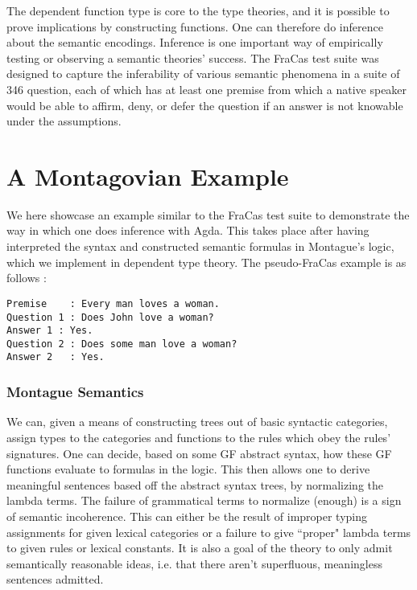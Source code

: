 \documentclass[a4paper, 11pt]{article}
\begin{document}
The dependent function type is core to the type theories, and it is possible to
prove implications by constructing functions. One can therefore do inference
about the semantic encodings. Inference is one important way of empirically
testing or observing a semantic theories' success. The FraCas test suite
\cite{cooper1996using} was designed to capture the inferability of various
semantic phenomena in a suite of 346 question, each of which has at least one
premise from which a native speaker would be able to affirm, deny, or defer the
question if an answer is not knowable under the assumptions.

\section{A Montagovian Example}

We here showcase an example similar to the FraCas test suite to demonstrate the
way in which one does inference with Agda. This takes place after having
interpreted the syntax and constructed semantic formulas in Montague's logic,
which we implement in dependent type theory. The pseudo-FraCas example is as
follows :

\begin{verbatim}
Premise    : Every man loves a woman.
Question 1 : Does John love a woman?
Answer 1 : Yes.
Question 2 : Does some man love a woman?
Answer 2   : Yes.
\end{verbatim}

\subsubsection{Montague Semantics}

We can, given a means of constructing trees out of basic syntactic categories,
assign types to the categories and functions to the rules which obey the rules'
signatures. One can decide, based on some GF abstract syntax, how these GF
functions evaluate to formulas in the logic. This then allows one to derive
meaningful sentences based off the abstract syntax trees, by normalizing the
lambda terms. The failure of grammatical terms to normalize (enough) is a sign
of semantic incoherence. This can either be the result of improper typing
assignments for given lexical categories or a failure to give ``proper" lambda
terms to given rules or lexical constants. It is also a goal of the theory to
only admit semantically reasonable ideas, i.e. that there aren't superfluous,
meaningless sentences admitted.
\end{document}
